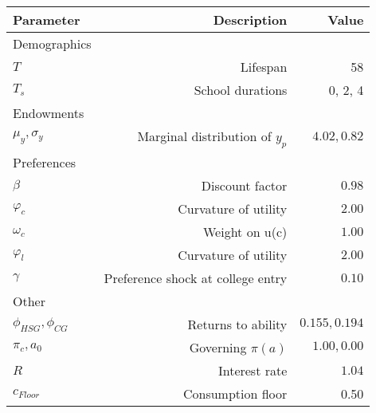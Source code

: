\begin{tabular}{lrr}
\hline
Parameter & Description  & Value  \\
\hline
Demographics &   &   \\
$T$ & Lifespan  & 58  \\
$T_{s}$ & School durations  & 0, 2, 4  \\
Endowments &   &   \\
$\mu_{y}, \sigma_{y}$ & Marginal distribution of $y_{p}$  & $4.02, 0.82$  \\
Preferences &   &   \\
$\beta$ & Discount factor  & $0.98$  \\
$\varphi_{c}$ & Curvature of utility  & $2.00$  \\
$\omega_{c}$ & Weight on u(c)  & $1.00$  \\
$\varphi_{l}$ & Curvature of utility  & $2.00$  \\
$\gamma$ & Preference shock at college entry  & $0.10$  \\
Other &   &   \\
$\phi_{HSG}, \phi_{CG}$ & Returns to ability  & $0.155, 0.194$  \\
$\pi_{c}, a_{0}$ & Governing $\pi(a)$  & $1.00, 0.00$  \\
$R$ & Interest rate  & $1.04$  \\
$c_{Floor}$ & Consumption floor  & 0.50  \\
\hline
\end{tabular}%
